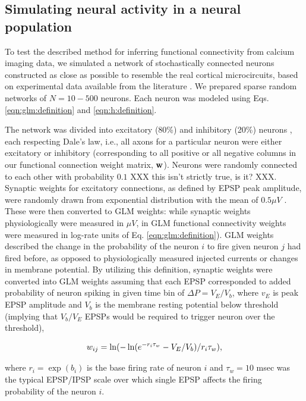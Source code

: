 \subsection{Simulating neural activity in a neural population} \label{sec:results:simulations}

To test the described method for inferring functional connectivity from calcium imaging data, we simulated a network of stochastically connected neurons constructed as close as possible to resemble the real cortical microcircuits, based on experimental data available from the literature \cite{Braitenberg1998, Urquijo2000, Lefort2009, Sayer1990}.  We prepared sparse random networks of $N=10-500$ neurons. Each neuron was modeled using Eqs. \eqref{eqn:glm:definition} and \eqref{eqn:h:definition}.

The network was divided into excitatory (80\%) and inhibitory (20\%) neurons \cite{Braitenberg1998, Urquijo2000}, each respecting Dale's law, i.e., all axons for a particular neuron were either excitatory or inhibitory (corresponding to all positive or all negative columns in our functional connection weight matrix, $\mathbf{w}$). Neurons were randomly connected to each other with probability $0.1$ \cite{Braitenberg1998, Lefort2009} XXX this isn't strictly true, is it? XXX.  Synaptic weights for excitatory connections, as defined by EPSP peak amplitude, were randomly drawn from exponential distribution with the mean of $0.5 \mu V$ \cite{Lefort2009, Sayer1990}. These were then converted to GLM weights: while synaptic weights physiologically were measured in $\mu V$, in GLM functional connectivity weights were measured in log-rate units of Eq. \eqref{eqn:glm:definition}). GLM weights described the change in the probability of the neuron $i$ to fire given neuron $j$ had fired before, as opposed to physiologically measured injected currents or changes in membrane potential. By utilizing this definition, synaptic weights were converted into GLM weights assuming that each EPSP corresponded to added probability of neuron spiking in given time bin of $\Delta P = V_E/V_{b}$, where $v_E$ is peak EPSP amplitude and $V_b$ is the membrane resting potential below threshold (implying that $V_{b}/V_E$ EPSPs would be required to trigger neuron over the threshold), 

\begin{equation}\label{eqn:convert}
\w_{ij}=\ln(-\ln(e^{-r_i\tau_w}-V_E/V_{b})/r_i\tau_w), 
\end{equation}

\noindent where $r_i=\exp(b_i)$ is the base firing rate of neuron $i$ and $\tau_w=10$ msec was the typical EPSP/IPSP scale over which single EPSP affects the firing probability of the neuron $i$.  %
% 

